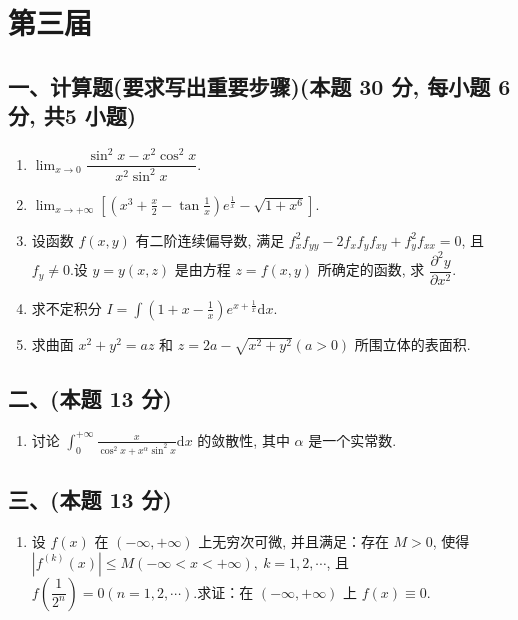 \newpage
\section{第三届}

\subsection*{一、计算题(要求写出重要步骤)(本题 30 分,  每小题 6分,  共5 小题)}
\begin{enumerate}
    \item $\displaystyle\lim_{x\rightarrow 0}\dfrac{\sin^2 x - x^2 \cos^2 x}{x^2 \sin^2 x}$.
    \item $\displaystyle\lim_{x\rightarrow +\infty}\left[\left(x^3 + \frac{x}{2} - \tan \frac{1}{x}\right)e^{\frac{1}{x}} - \sqrt{1 + x^6}\right]$.
    \item 设函数 $f(x,y)$ 有二阶连续偏导数, 满足 $f_x^2 f_{yy} - 2f_x f_y f_{xy} + f_y^2 f_{xx} = 0$, 且 $f_y \neq 0$.设 $y = y(x,z)$ 是由方程 $z = f(x,y)$ 所确定的函数, 求 $\dfrac{\partial^2 y}{\partial x^2}$.
    \item 求不定积分 $I = \displaystyle\int \left(1 + x - \frac{1}{x}\right)e^{x + \frac{1}{x}}\mathrm{d}x$.
    \item 求曲面 $x^2 + y^2 = az$ 和 $z = 2a - \sqrt{x^2 + y^2} (a > 0)$ 所围立体的表面积.
\end{enumerate}

\subsection*{二、(本题 13 分)}
\begin{enumerate}[start=6]
    \item 讨论 $\displaystyle\int_0^{+\infty} \frac{x}{\cos^2 x + x^\alpha \sin^2 x} \mathrm{d}x$ 的敛散性, 其中 $\alpha$ 是一个实常数.
\end{enumerate}

\subsection*{三、(本题 13 分)}
\begin{enumerate}[start=7]
    \item 设 $f(x)$ 在 $(-\infty, +\infty)$ 上无穷次可微, 并且满足：存在 $M > 0$, 使得 $|f^{(k)}(x)| \leqslant M (-\infty < x < +\infty), \ k = 1, 2, \cdots$, 且 $f\left(\dfrac{1}{2^n}\right) = 0 (n = 1, 2, \cdots)$.求证：在 $(-\infty, +\infty)$ 上 $f(x) \equiv 0$.
\end{enumerate}

